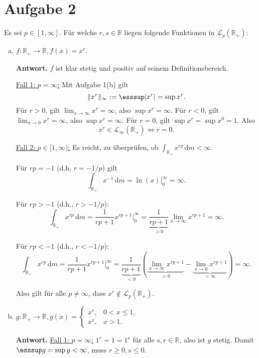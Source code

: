 \documentclass[10pt]{article}\usepackage[]{graphicx}\usepackage[]{color}
\newcommand{\R}{\mathbb{R}}
\newcommand{\df}{\,\textrm{d}}
\begin{document}
\section*{Aufgabe 2}
Es sei $p \in [1, \infty]$. Für welche $r,s \in \R$ liegen folgende
Funktionen in $\mathscr{L}_p(\R_+)$:
\begin{enumerate}[(a)]
  \item $f: \R_+ \to \R, f(x) = x^r$.
  
        {\bf Antwort.} $f$ ist klar stetig und positiv auf seinem Definitionsbereich.
        
        \uline{Fall 1: $p = \infty$:} Mit Aufgabe 1(b) gilt
        \[
          \|x^r\|_{\infty} := \esssup|x^r| = \sup x^r.
        \]
        Für $r > 0$, gilt $\lim_{x \to \infty} x^r = \infty$, also $\sup x^r = \infty$.
        Für $r < 0$, gilt $\lim_{x \to 0}x^r = \infty$, also $\sup x^r = \infty$.
        Für $r = 0$, gilt $\sup x^r = \sup x^0 = 1$. Also
        \[
          x^r \in \mathscr{L}_{\infty}(\R_+) \Leftrightarrow r = 0.
        \]
        
        \uline{Fall 2: $p \in [1, \infty)$:}
        Es reicht, zu überprüfen, ob $\int_{\R_+}x^{rp} \df m < \infty$.
        
        Für $rp = -1$ (d.h, $r = -1/p$) gilt
        \[
        \int_{\R_+} x^{-1} \df m = \ln(x)|^{\infty}_0 = \infty.
        \]
        
        Für $rp > -1$ (d.h., $r > -1/p$):
        \[
          \int_{\R_+} x^{rp} \df m = \frac{1}{rp+1} x^{rp+1}|_0^{\infty} = \underbrace{\frac{1}{rp+1}}_{> 0} \lim_{x \to \infty} x^{rp+1} = \infty.
        \]

        Für $rp < -1$ (d.h., $r < -1/p$):
        \[
          \int_{\R_+} x^{rp} \df m = \frac{1}{rp+1} x^{rp+1}|_0^{\infty} = \underbrace{\frac{1}{rp+1}}_{< 0} \left(\underbrace{\lim_{x \to \infty} x^{rp+1}}_{= 0} - \underbrace{\lim_{x \to 0} x^{rp+1}}_{= \infty} \right) = \infty.
        \]
        
        Also gilt für alle $p \neq \infty$, dass $x^r \notin \mathscr{L}_{p}(\R_+)$.
  
  \item $g: \R_+ \to \R, g(x) = \begin{cases}x^r, & 0 < x \leq 1,\\ x^s, & x > 1. \end{cases}$
  
        {\bf Antwort.} 
        \uline{Fall 1: $p = \infty$:}
        $1^r = 1 = 1^s$ für alle $s,r \in \R$, also ist $g$ stetig.
        Damit $\esssup g = \sup g < \infty$, muss $r \geq 0, s \leq 0$.
        

\end{enumerate}
\end{document}
